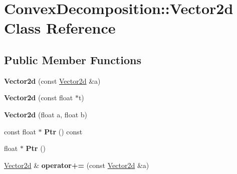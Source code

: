 \hypertarget{class_convex_decomposition_1_1_vector2d}{\section{Convex\+Decomposition\+:\+:Vector2d Class Reference}
\label{class_convex_decomposition_1_1_vector2d}
}
\subsection*{Public Member Functions}
\begin{DoxyCompactItemize}
\item 
\hypertarget{class_convex_decomposition_1_1_vector2d_ad260042f734ec4a5f51f59f03158cee9}{{\bfseries Vector2d} (const \hyperlink{class_convex_decomposition_1_1_vector2d}{Vector2d} \&a)}\label{class_convex_decomposition_1_1_vector2d_ad260042f734ec4a5f51f59f03158cee9}

\item 
\hypertarget{class_convex_decomposition_1_1_vector2d_aab748925fcc8d57b7bf439b59810fcf4}{{\bfseries Vector2d} (const float $\ast$t)}\label{class_convex_decomposition_1_1_vector2d_aab748925fcc8d57b7bf439b59810fcf4}

\item 
\hypertarget{class_convex_decomposition_1_1_vector2d_aba616371f0407f75041e0fa70a58d89d}{{\bfseries Vector2d} (float a, float b)}\label{class_convex_decomposition_1_1_vector2d_aba616371f0407f75041e0fa70a58d89d}

\item 
\hypertarget{class_convex_decomposition_1_1_vector2d_a32f42a47f6239f7d667f45c3fea84667}{const float $\ast$ {\bfseries Ptr} () const }\label{class_convex_decomposition_1_1_vector2d_a32f42a47f6239f7d667f45c3fea84667}

\item 
\hypertarget{class_convex_decomposition_1_1_vector2d_a656ad98af26e5a88e7026af0d19ccac3}{float $\ast$ {\bfseries Ptr} ()}\label{class_convex_decomposition_1_1_vector2d_a656ad98af26e5a88e7026af0d19ccac3}

\item 
\hypertarget{class_convex_decomposition_1_1_vector2d_a57cf7c1abdf46608ab7a354af969e681}{\hyperlink{class_convex_decomposition_1_1_vector2d}{Vector2d} \& {\bfseries operator+=} (const \hyperlink{class_convex_decomposition_1_1_vector2d}{Vector2d} \&a)}\label{class_convex_decomposition_1_1_vector2d_a57cf7c1abdf46608ab7a354af969e681}


\end{DoxyCompactItemize}
